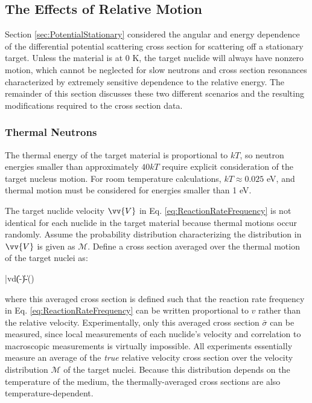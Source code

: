 \subsection{The Effects of Relative Motion}
\label{sec:ThermalEffects}

Section \ref{sec:PotentialStationary} considered the angular and energy dependence of the differential potential scattering cross section for scattering off a stationary target. Unless the material is at 0 K, the target nuclide will always have nonzero motion, which cannot be neglected for slow neutrons and cross section resonances characterized by extremely sensitive dependence to the relative energy. The remainder of this section discusses these two different scenarios and the resulting modifications required to the cross section data.

\subsubsection{Thermal Neutrons}
\label{sec:ThermalNeutrons}
The thermal energy of the target material is proportional to \(kT\), so neutron energies smaller than approximately \(40kT\) require explicit consideration of the target nucleus motion. For room temperature calculations, \(kT\approx0.025\) eV, and thermal motion must be considered for energies smaller than 1 eV.

The target nuclide velocity \(\vv{V}\) in Eq. \eqref{eq:ReactionRateFrequency} is not identical for each nuclide in the target material because thermal motions occur randomly. Assume the probability distribution characterizing the distribution in \(\vv{V}\) is given as \(\mathscr{M}\). Define a cross section averaged over the thermal motion of the target nuclei as:

\beq
\label{eq:OneOverV}
\bar{\sigma}v\equiv\int d\sigma(\|-\|)\|-\|()
\eeq

where this averaged cross section is defined such that the reaction rate frequency in Eq. \eqref{eq:ReactionRateFrequency} can be written proportional to \(v\) rather than the relative velocity. Experimentally, only this averaged cross section \(\bar{\sigma}\) can be measured, since local measurements of each nuclide's velocity and correlation to macroscopic measurements is virtually impossible. All experiments essentially measure an average of the {\it true} relative velocity cross section over the velocity distribution \(\mathscr{M}\) of the target nuclei. Because this distribution depends on the temperature of the medium, the thermally-averaged cross sections are also temperature-dependent.

